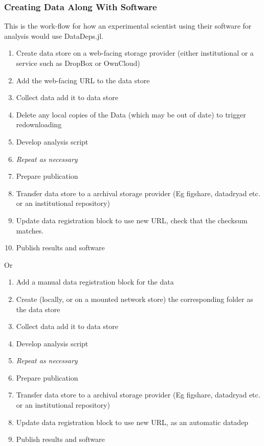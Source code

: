 \documentclass{jors}
\begin{document}
\subsubsection{Creating Data Along With Software}
This is the work-flow for how an experimental scientist using their software for analysis would use DataDeps.jl.
\begin{enumerate}
	\item Create data store on a web-facing storage provider (either institutional or a service such as DropBox or OwnCloud)
	\item Add the web-facing URL to the data store 
	\item Collect data add it to data store
	\item Delete any local copies of the Data (which may be out of date) to trigger redownloading
	\item Develop analysis script
	\item \emph{Repeat as necessary}
	\item Prepare publication
	\item Transfer data store to a archival storage provider (Eg figshare, datadryad etc. or an institutional repository)
	\item Update data registration block to use new URL, check that the checksum matches.
	\item Publish results and software
\end{enumerate}
Or 
\begin{enumerate}
	\item Add a manual data registration block for the data
	\item Create (locally, or on a mounted network store) the corresponding folder as the data store
	\item Collect data add it to data store
	\item Develop analysis script
	\item \emph{Repeat as necessary}
	\item Prepare publication
	\item Transfer data store to a archival storage provider (Eg figshare, datadryad etc. or an institutional repository)
	\item Update data registration block to use new URL, as an automatic datadep
	\item Publish results and software
\end{enumerate}
\end{document}
